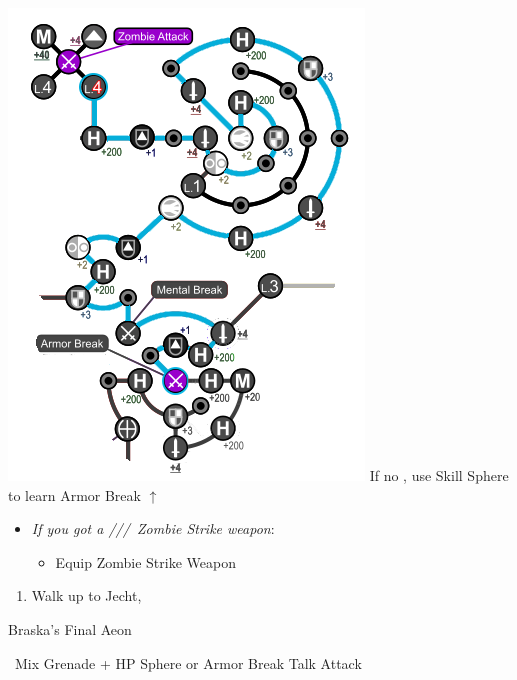\begin{spheregrid}
\begin{multicols}{2}
\begin{itemize}
            \includegraphics[width=.8\columnwidth]{graphics/Tidus_BFA}
            \rikkuf If no \od, use Skill Sphere to learn Armor Break $\uparrow$
        \end{itemize}
    \end{multicols}
\end{spheregrid}
\colstart
    \begin{equip}
        \begin{itemize}
            \item \textit{If you got a \lulu/\kimahri/\wakka/\rikku\ Zombie Strike weapon}:
            \begin{itemize}
                \item Equip Zombie Strike Weapon
            \end{itemize}
        \end{itemize}
    \end{equip}
    \begin{enumerate}[resume]
        \item Walk up to Jecht, \cs[4:30]
    \end{enumerate}
    \bothvfill\winvfill\lossvfill
    \begin{battle}[180000]{Braska's Final Aeon}
        \begin{itemize}
            \switch{\yuna}{\rikku}
            \rikkuf \od\ Mix Grenade + HP Sphere or Armor Break
            \tidusf Talk
            \switch{\auron}{\yuna}
            \summon{\bahamut}
            \bahamutf Attack
        \end{itemize}
    \end{battle}
